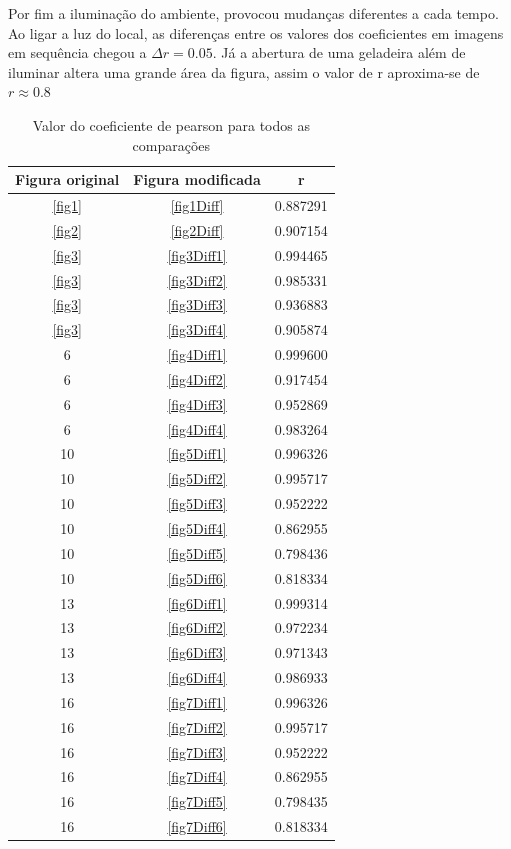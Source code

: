 \documentclass[10pt,a4paper]{article}
\begin{document}
Por fim a iluminação do ambiente, provocou mudanças diferentes a cada
tempo. Ao ligar a luz do local, as diferenças entre os valores dos
coeficientes em imagens em sequência chegou a $\Delta r=0.05 $. Já a
abertura de uma geladeira além de iluminar altera uma grande área da
figura, assim o valor de r aproxima-se de $r\approx 0.8$

\begin{table}[h!]
  \begin{center}
    \caption{Valor do coeficiente de pearson para todos as comparações}
    \begin{tabular}{|c|c|c|}
      \hline
      Figura original & Figura modificada & r\\
      \hline
      \ref{fig1} &  \ref{fig1Diff} &  0.887291 \\
      \ref{fig2} &  \ref{fig2Diff} &  0.907154\\
      \ref{fig3} &  \ref{fig3Diff1} & 0.994465\\
      \ref{fig3} & \ref{fig3Diff2} &  0.985331\\
      \ref{fig3} &  \ref{fig3Diff3} &  0.936883\\
      \ref{fig3} &  \ref{fig3Diff4} &  0.905874\\
      6 &  \ref{fig4Diff1} & 0.999600\\
      6 &  \ref{fig4Diff2} &  0.917454\\
      6 &  \ref{fig4Diff3} &   0.952869\\
      6 &  \ref{fig4Diff4} &   0.983264\\
      10 &  \ref{fig5Diff1} & 0.996326\\
      10 &  \ref{fig5Diff2} & 0.995717\\
      10 &  \ref{fig5Diff3} & 0.952222\\
      10 &  \ref{fig5Diff4} & 0.862955\\
      10 &  \ref{fig5Diff5} & 0.798436\\
      10 &  \ref{fig5Diff6} & 0.818334\\
      13 &  \ref{fig6Diff1} & 0.999314\\
      13 &  \ref{fig6Diff2} & 0.972234\\
      13 &  \ref{fig6Diff3} & 0.971343\\
      13 &  \ref{fig6Diff4} & 0.986933\\
      16 &  \ref{fig7Diff1} & 0.996326\\
      16 &  \ref{fig7Diff2} & 0.995717\\
      16 &  \ref{fig7Diff3} & 0.952222\\
      16 &  \ref{fig7Diff4} & 0.862955\\
      16 &  \ref{fig7Diff5} & 0.798435\\
      16 &  \ref{fig7Diff6} &  0.818334\\
      \hline
    \end{tabular}
  \end{center}\label{tab:final}
\end{table}
\end{document}
